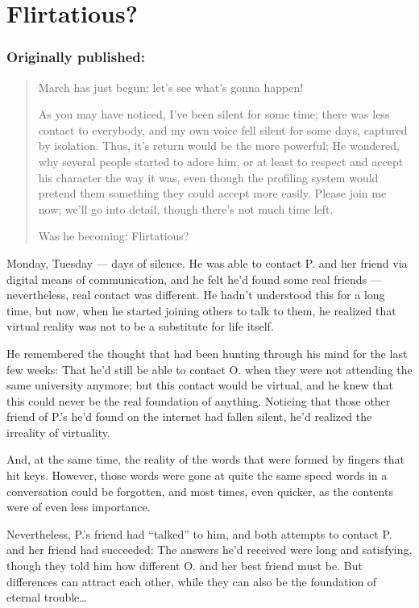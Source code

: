 \chapter{Flirtatious?}
\label{cha:flirtatious-qm}
\subsection*{Originally published: }
\begin{quote}
March has just begun; let's see what's gonna happen!

As you may have noticed, I've been silent for some time; there was less contact to everybody, and my own voice fell silent for some days, captured by isolation. 
Thus, it's return would be the more powerful; He wondered, why several people started to adore him, or at least to respect and accept his character the way it was, even though the profiling system would pretend them something they could accept more easily. 
Please join me now; we'll go into detail, though there's not much time left.

Was he becoming: Flirtatious?
\end{quote}

Monday, Tuesday --- days of silence. He was able to contact P. and her friend via digital means of communication, and he felt he'd found some real friends --- nevertheless, real contact was different. He hadn't understood this for a long time, but now, when he started joining others to talk to them, he realized that virtual reality was not to be a substitute for life itself.

He remembered the thought that had been hunting through his mind for the last few weeks: That he'd still be able to contact O. when they were not attending the same university anymore; but this contact would be virtual, and he knew that this could never be the real foundation of anything. Noticing that those other friend of P.'s he'd found on the internet had fallen silent, he'd realized the irreality of virtuality.

And, at the same time, the reality of the words that were formed by fingers that hit keys. However, those words were gone at quite the same speed words in a conversation could be forgotten, and most times, even quicker, as the contents were of even less importance.

Nevertheless, P.'s friend had \enquote{talked} to him, and both attempts to contact P. and her friend had succeeded: The answers he'd received were long and satisfying, though they told him how different O. and her best friend must be. But differences can attract each other, while they can also be the foundation of eternal trouble\ldots

